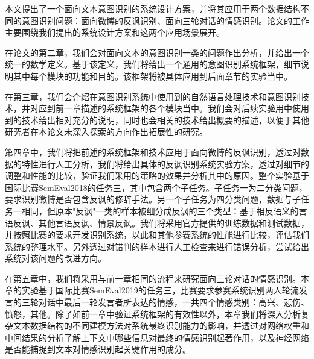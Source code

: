 本文提出了一个面向文本意图识别的系统设计方案，并将其应用于两个数据结构不同的意图识别问题：面向微博的反讽识别、面向三轮对话的情感识别。论文的工作主要围绕我们提出的系统设计方案和这两个应用场景展开。

在论文的第二章，我们会对面向文本的意图识别一类的问题作出分析，并给出一个统一的数学定义。基于该定义，我们将给出一个通用的意图识别系统框架，细节说明其中每个模块的功能和目的。该框架将被具体应用到后面章节的实验当中。

在第三章，我们会介绍在意图识别系统中使用到的自然语言处理技术和意图识别技术，并对应到前一章描述的系统框架的各个模块当中。我们会对后续实验用中使用到的技术给出相对充分的说明，同时也会相关的技术给出概要的描述，以便于其他研究者在本论文未深入探索的方向作出拓展性的研究。

第四章中，我们将把前述的系统框架和技术应用于面向微博的反讽识别，透过对数据的特性进行人工分析，我们将给出具体的反讽识别系统实验方案，透过对细节的调整和性能的比较，验证我们采用的策略的效果并分析其中的原因。整个实验基于国际比赛SemEval2018的任务三\cite{van2018semeval}，其中包含两个子任务。子任务一为二分类问题，要求识别微博是否包含反讽的修辞手法。另一个子任务为四分类问题，数据与子任务一相同，但原本"反讽"一类的样本被细分成反讽的三个类型：基于相反语义的言语反讽、其他言语反讽、情景反讽。我们将采用官方提供的训练数据和测试数据，并按照比赛的要求开发识别系统，以此和其他参赛系统的性能进行比较，评估我们系统的整理水平。另外透过对错判的样本进行人工检查来进行错误分析，尝试给出系统对该问题的改进方向。

在第五章中，我们将采用与前一章相同的流程来研究面向三轮对话的情感识别。本章的实验基于国际比赛SemEval2019的任务三\cite{SemEval2019Task3}，比赛要求参赛系统识别两人轮流发言的三轮对话中最后一轮发言者所表达的情感，一共四个情感类别：高兴、悲伤、愤怒，其他。除了如前一章中验证系统框架的有效性以外，本章我们将深入分析复杂文本数据结构的不同建模方法对系统最终识别能力的影响，并透过对网络权重和中间结果的分析了解上下文中哪些信息对最终的情感识别起著作用，以及神经网络是否能捕捉到文本对情感识别起关键作用的成分。



















